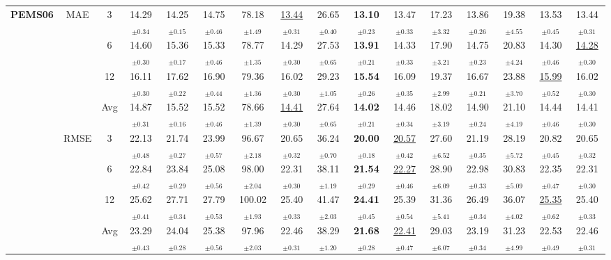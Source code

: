 \begin{table}[t]
{\begin{tabular}{ccc|ccc|cccc|cccc|cc}
\midrule
\multirow{12}{*}{\textbf{PEMS06}} & \multirow{4}{*}{MAE} & 3 & 14.29$_{\pm0.34}$ & 14.25$_{\pm0.15}$ & 14.75$_{\pm0.46}$ & 78.18$_{\pm1.49}$ & \underline{13.44$_{\pm0.31}$} & 26.65$_{\pm0.40}$ & \textbf{13.10$_{\pm0.23}$} & 13.47$_{\pm0.33}$ & 17.23$_{\pm3.32}$ & 13.86$_{\pm0.26}$ & 19.38$_{\pm4.55}$ & 13.53$_{\pm0.45}$ & 13.44$_{\pm0.31}$ \\
 &  & 6 & 14.60$_{\pm0.30}$ & 15.36$_{\pm0.17}$ & 15.33$_{\pm0.46}$ & 78.77$_{\pm1.35}$ & 14.29$_{\pm0.30}$ & 27.53$_{\pm0.65}$ & \textbf{13.91$_{\pm0.21}$} & 14.33$_{\pm0.33}$ & 17.90$_{\pm3.21}$ & 14.75$_{\pm0.23}$ & 20.83$_{\pm4.24}$ & 14.30$_{\pm0.46}$ & \underline{14.28$_{\pm0.30}$} \\
 &  & 12 & 16.11$_{\pm0.30}$ & 17.62$_{\pm0.22}$ & 16.90$_{\pm0.44}$ & 79.36$_{\pm1.36}$ & 16.02$_{\pm0.30}$ & 29.23$_{\pm1.05}$ & \textbf{15.54$_{\pm0.26}$} & 16.09$_{\pm0.35}$ & 19.37$_{\pm2.99}$ & 16.67$_{\pm0.21}$ & 23.88$_{\pm3.70}$ & \underline{15.99$_{\pm0.52}$} & 16.02$_{\pm0.30}$ \\
 &  & Avg & 14.87$_{\pm0.31}$ & 15.52$_{\pm0.16}$ & 15.52$_{\pm0.46}$ & 78.66$_{\pm1.39}$ & \underline{14.41$_{\pm0.30}$} & 27.64$_{\pm0.65}$ & \textbf{14.02$_{\pm0.21}$} & 14.46$_{\pm0.34}$ & 18.02$_{\pm3.19}$ & 14.90$_{\pm0.24}$ & 21.10$_{\pm4.19}$ & 14.44$_{\pm0.46}$ & 14.41$_{\pm0.30}$ \\
\cmidrule(lr){2-16}
 & \multirow{4}{*}{RMSE} & 3 & 22.13$_{\pm0.48}$ & 21.74$_{\pm0.27}$ & 23.99$_{\pm0.57}$ & 96.67$_{\pm2.18}$ & 20.65$_{\pm0.32}$ & 36.24$_{\pm0.70}$ & \textbf{20.00$_{\pm0.18}$} & \underline{20.57$_{\pm0.42}$} & 27.60$_{\pm6.52}$ & 21.19$_{\pm0.35}$ & 28.19$_{\pm5.72}$ & 20.82$_{\pm0.45}$ & 20.65$_{\pm0.32}$ \\
 &  & 6 & 22.84$_{\pm0.42}$ & 23.84$_{\pm0.29}$ & 25.08$_{\pm0.56}$ & 98.00$_{\pm2.04}$ & 22.31$_{\pm0.30}$ & 38.11$_{\pm1.19}$ & \textbf{21.54$_{\pm0.29}$} & \underline{22.27$_{\pm0.46}$} & 28.90$_{\pm6.09}$ & 22.98$_{\pm0.33}$ & 30.83$_{\pm5.09}$ & 22.35$_{\pm0.47}$ & 22.31$_{\pm0.30}$ \\
 &  & 12 & 25.62$_{\pm0.41}$ & 27.71$_{\pm0.34}$ & 27.79$_{\pm0.53}$ & 100.02$_{\pm1.93}$ & 25.40$_{\pm0.33}$ & 41.47$_{\pm2.03}$ & \textbf{24.41$_{\pm0.45}$} & 25.39$_{\pm0.54}$ & 31.36$_{\pm5.41}$ & 26.49$_{\pm0.34}$ & 36.07$_{\pm4.02}$ & \underline{25.35$_{\pm0.62}$} & 25.40$_{\pm0.33}$ \\
 &  & Avg & 23.29$_{\pm0.43}$ & 24.04$_{\pm0.28}$ & 25.38$_{\pm0.56}$ & 97.96$_{\pm2.03}$ & 22.46$_{\pm0.31}$ & 38.29$_{\pm1.20}$ & \textbf{21.68$_{\pm0.28}$} & \underline{22.41$_{\pm0.47}$} & 29.03$_{\pm6.07}$ & 23.19$_{\pm0.34}$ & 31.23$_{\pm4.99}$ & 22.53$_{\pm0.49}$ & 22.46$_{\pm0.31}$ \\

\end{tabular}}
\end{table}
